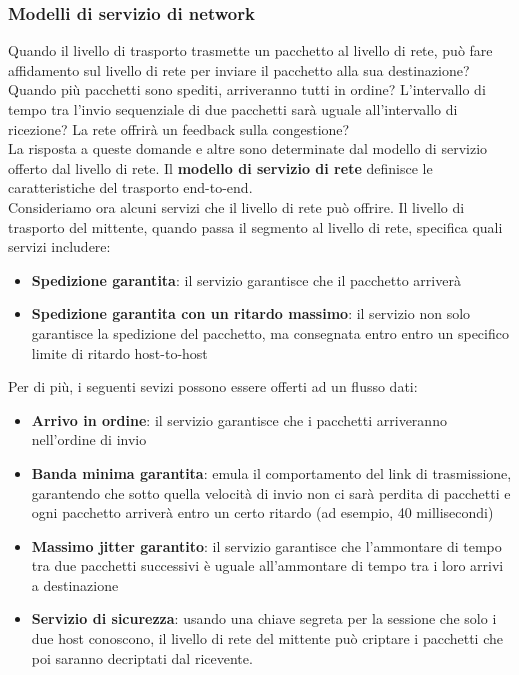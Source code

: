 \documentclass[11pt,a4paper]{article}
\begin{document}
\subsubsection{Modelli di servizio di network}
Quando il livello di trasporto trasmette un pacchetto al livello di rete, può fare affidamento sul livello di rete per inviare il pacchetto alla sua destinazione? Quando più pacchetti sono spediti, arriveranno tutti in ordine? L'intervallo di tempo tra l'invio sequenziale di due pacchetti sarà uguale all'intervallo di ricezione? La rete offrirà un feedback sulla congestione? \\
La risposta a queste domande e altre sono determinate dal modello di servizio offerto dal livello di rete. Il \textbf{modello di servizio di rete} definisce le caratteristiche del trasporto end-to-end. \\
Consideriamo ora alcuni servizi che il livello di rete può offrire. Il livello di trasporto del mittente, quando passa il segmento al livello di rete, specifica quali servizi includere:
\begin{itemize}
	\item \textbf{Spedizione garantita}: il servizio garantisce che il pacchetto arriverà
	\item \textbf{Spedizione garantita con un ritardo massimo}: il servizio non solo garantisce la spedizione del pacchetto, ma consegnata entro entro un specifico limite di ritardo host-to-host
\end{itemize}
Per di più, i seguenti sevizi possono essere offerti ad un flusso dati:
\begin{itemize}
	\item \textbf{Arrivo in ordine}: il servizio garantisce che i pacchetti arriveranno nell'ordine di invio
	\item \textbf{Banda minima garantita}: emula il comportamento del link di trasmissione, garantendo che sotto quella velocità di invio non ci sarà perdita di pacchetti e ogni pacchetto arriverà entro un certo ritardo (ad esempio, 40 millisecondi)
	\item \textbf{Massimo jitter garantito}: il servizio garantisce che l'ammontare di tempo tra due pacchetti successivi è uguale all'ammontare di tempo tra i loro arrivi a destinazione
	\item \textbf{Servizio di sicurezza}: usando una chiave segreta per la sessione che solo i due host conoscono, il livello di rete del mittente può criptare i pacchetti che poi saranno decriptati dal ricevente.
\end{itemize}
\end{document}

